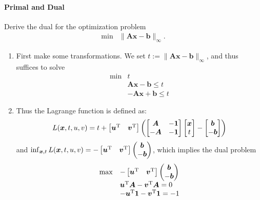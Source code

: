 \paragraph{Primal and Dual}
\begin{example}
Derive the dual for the optimization problem
\begin{equation}
\begin{array}{ll}
\min&\|\bm{Ax}-\bm b\|_\infty.
\end{array}
\end{equation}
\begin{enumerate}
\item
First make some transformations. We set $t:=\|\bm{Ax}-\bm b\|_\infty$, and thus suffices to solve
\begin{equation}
\begin{array}{ll}
\min&t\\
&\bm {Ax}-\bm b\le t\\
&-\bm{Ax}+\bm b\le t
\end{array}
\end{equation}
\item
Thus the Lagrange function is defined as:
\[
L(\bm x,t,u,v)=t+\begin{bmatrix}
\bm u^{\mathrm T}&\bm v^{\mathrm T}
\end{bmatrix}\left(
\begin{bmatrix}
\bm A&-\bm 1\\-\bm A&-\bm 1
\end{bmatrix}\begin{bmatrix}
\bm x\\ t
\end{bmatrix}-\begin{bmatrix}
\bm b\\-\bm b
\end{bmatrix}
\right)
\]
and $\inf_{\bm x,t}L(\bm x,t,u,v)=-\begin{bmatrix}
\bm u^{\mathrm T}&\bm v^{\mathrm T}
\end{bmatrix}\begin{pmatrix}
\bm b\\-\bm b
\end{pmatrix}$, which implies the dual problem
\[
\begin{array}{ll}
\max&-\begin{bmatrix}
\bm u^{\mathrm T}&\bm v^{\mathrm T}
\end{bmatrix}\begin{pmatrix}
\bm b\\-\bm b
\end{pmatrix}\\
&\bm u^{\mathrm T}\bm A-\bm v^{\mathrm T}\bm A=0\\
&-\bm u^{\mathrm T}\bm 1-\bm v^{\mathrm T}\bm 1=-1
\end{array}
\]

\end{enumerate}
\end{example}
